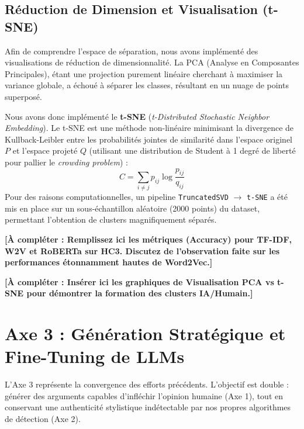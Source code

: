 \documentclass[11pt,a4paper]{article}
\begin{document}
\subsection{Réduction de Dimension et Visualisation (t-SNE)}
Afin de comprendre l'espace de séparation, nous avons implémenté des visualisations de réduction de dimensionnalité.
La PCA (Analyse en Composantes Principales), étant une projection purement linéaire cherchant à maximiser la variance globale, a échoué à séparer les classes, résultant en un nuage de points superposé.

Nous avons donc implémenté le \textbf{t-SNE} (\textit{t-Distributed Stochastic Neighbor Embedding}). Le t-SNE est une méthode non-linéaire minimisant la divergence de Kullback-Leibler entre les probabilités jointes de similarité dans l'espace originel $P$ et l'espace projeté $Q$ (utilisant une distribution de Student à 1 degré de liberté pour pallier le \textit{crowding problem}) :
\begin{equation}
    C = \sum_{i \neq j} p_{ij} \log \frac{p_{ij}}{q_{ij}}
\end{equation}
Pour des raisons computationnelles, un pipeline \texttt{TruncatedSVD} $\rightarrow$ \texttt{t-SNE} a été mis en place sur un sous-échantillon aléatoire (2000 points) du dataset, permettant l'obtention de clusters magnifiquement séparés.

\vspace{0.5cm}
\begin{tcolorbox}[colback=blue!5!white,colframe=blue!75!black,title=Résultats Expérimentaux Axe 2]
\textbf{[À compléter : Remplissez ici les métriques (Accuracy) pour TF-IDF, W2V et RoBERTa sur HC3. Discutez de l'observation faite sur les performances étonnamment hautes de Word2Vec.]}

\textbf{[À compléter : Insérer ici les graphiques de Visualisation PCA vs t-SNE pour démontrer la formation des clusters IA/Humain.]}
\end{tcolorbox}


\section{Axe 3 : Génération Stratégique et Fine-Tuning de LLMs}

L'Axe 3 représente la convergence des efforts précédents. L'objectif est double : générer des arguments capables d'infléchir l'opinion humaine (Axe 1), tout en conservant une authenticité stylistique indétectable par nos propres algorithmes de détection (Axe 2).
\end{document}
